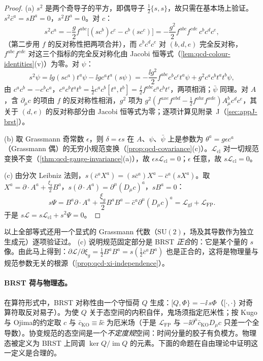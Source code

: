 \begin{proof}
(a) $s^2$ 是两个奇导子的平方，即偶导子 $\frac12\{s,s\}$，故只需在基本场上验证。$s^2\bar c^a=sB^a=0$，$s^2B^a=0$。对 $c$：
\[
s^2c^a=-\frac g2f^{abc}\big[(sc^b)c^c-c^b(sc^c)\big]=-\frac{g^2}2f^{abc}f^{cde}\,c^bc^dc^e ,
\]
（第二步用 $f$ 的反对称性把两项合并），而 $c^bc^dc^e$ 对 $(b,d,e)$ 完全反对称，$f^{abc}f^{cde}$ 对这三个指标的完全反对称化由 Jacobi 恒等式（\cref{lem:qcd-colour-identities}(v)）为零。对 $\psi$：
\[
s^2\psi=\ii g(sc^a)t^a\psi-\ii gc^at^a(s\psi)=-\frac{\ii g^2}2f^{abc}c^bc^ct^a\psi+g^2c^ac^bt^at^b\psi ,
\]
由 $c^ac^b=-c^bc^a$，$c^ac^bt^at^b=\frac12c^ac^b[t^a,t^b]=\frac{\ii}2f^{abc}c^ac^bt^c$，两项相消；$\bar\psi$ 同理。对 $A$，含 $\partial_\mu c$ 的项由 $f$ 的反对称性相消，$g^2$ 项为 $g^2(f^{axe}f^{xbd}-\frac12f^{abx}f^{xde})A^b_\mu c^dc^e$，其关于 $(d,e)$ 的反对称部分由 Jacobi 恒等式为零；逐项计算见附录~J（\cref{sec:appJ-brst}）。

(b) 取 Grassmann 奇常数 $\epsilon$，则 $\delta=\epsilon s$ 在 $A$、$\psi$、$\bar\psi$ 上是参数为 $\theta^a=g\epsilon c^a$（Grassmann 偶）的无穷小规范变换（\cref{prop:qcd-covariance}(c)）。$\mathcal L_{\mathrm{cl}}$ 对一切规范变换不变（\cref{thm:qcd-gauge-invariance}(a)），故 $\epsilon s\mathcal L_{\mathrm{cl}}=0$；$\epsilon$ 任意，故 $s\mathcal L_{\mathrm{cl}}=0$。

(c) 由分次 Leibniz 法则，$s(\bar c^aX^a)=(s\bar c^a)X^a-\bar c^a(sX^a)$。取 $X^a=\partial\cdot A^a+\frac{\xi_g}2B^a$，$s(\partial\cdot A^a)=\partial^\mu(D_\mu c)^a$，$sB^a=0$：
\[
s\Psi=B^a\partial\cdot A^a+\frac{\xi_g}2B^aB^a-\bar c^a\partial^\mu(D_\mu c)^a=\mathcal L_{\mathrm{gf}}+\mathcal L_{\mathrm{FP}} .
\]
于是 $s\mathcal L=s\mathcal L_{\mathrm{cl}}+s^2\Psi=0$。
\end{proof}

以上全部等式还用一个显式的 Grassmann 代数（$\mathrm{SU}(2)$，场及其导数作为独立生成元）逐项验证过。%
(c) 说明规范固定部分是 BRST \emph{正合}的：它是某个量的 $s$ 像。由此马上得到：$\partial\mathcal L/\partial\xi_g=\frac12B^aB^a=s(\frac12\bar c^aB^a)$ 也是正合的，这将是物理量与规范参数无关的根源（\cref{prop:qcd-xi-independence}）。

\paragraph{BRST 荷与物理态。}在算符形式中，BRST 对称性由一个守恒荷 $Q$ 生成：$[Q,\Phi\}=-\ii\,s\Phi$（$[\cdot,\cdot\}$ 对奇算符取反对易子）。为使 $Q$ 关于态空间的内积自伴，鬼场须指定厄米性；按 Kugo 与 Ojima\cite{KugoOjima1979}的约定取 $c$ 与 $\bar c_{\mathrm{KO}}\equiv\ii\bar c$ 为厄米场（于是 $\mathcal L_{\mathrm{FP}}$ 与 $-\ii\partial^\mu\bar c_{\mathrm{KO}}D_\mu c$ 只差一个全导数）。协变规范的态空间是一个\emph{不定度规}空间：时间分量的胶子有负模方。物理态被定义为 BRST 上同调 $\ker Q/\operatorname{im}Q$ 的元素。下面的命题在自由理论中证明这一定义是合理的。

